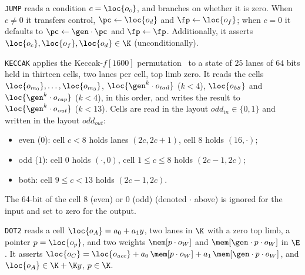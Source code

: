 \texttt{JUMP} reads a condition $c=\loc{o_c}$, and branches on whether it is zero. When $c\neq0$ it transfers control, $\pc\gets\loc{o_d}$ and $\fp\gets\loc{o_f}$; when $c=0$ it defaults to $\pc\gets\gen\cdot\pc$ and $\fp\gets\fp$. Additionally, it asserts $\loc{o_c},\loc{o_f}, \loc{o_d} \in \K$ (unconditionally).

\vspace{5mm}

\texttt{KECCAK} applies the Keccak-$f[1600]$ permutation~\cite{keccak} to a state of $25$ lanes of $64$ bits held in thirteen cells, two lanes per cell, top limb zero. It reads the cells $\loc{o_{m_0}},\dots,\loc{o_{m_3}}$, $\loc{\gen^k\cdot o_{\mathit{tail}}}$ ($k<4$), $\loc{o_{\mathit{b8}}}$ and $\loc{\gen^k\cdot o_{\mathit{cap}}}$ ($k<4$), in this order, and writes the result to $\loc{\gen^k\cdot o_{\mathit{out}}}$ ($k<13$). Cells are read in the layout $\mathit{odd}_{\mathit{in}}\in\{0,1\}$ and written in the layout $\mathit{odd}_{\mathit{out}}$:
\begin{itemize}
\item even ($0$): cell $c<8$ holds lanes $(2c,2c+1)$, cell $8$ holds $(16,\cdot)$;
\item odd ($1$): cell $0$ holds $(\cdot,0)$, cell $1\le c\le8$ holds $(2c-1,2c)$;
\item both: cell $9\le c<13$ holds $(2c-1,2c)$.
\end{itemize}
The 64-bit of the cell 8 (even) or 0 (odd) (denoted $\cdot$ above) is ignored for the input and set to zero for the output.

\vspace{5mm}

\texttt{DOT2} reads a cell $\loc{o_A}=a_0+a_1y$, two lanes in $\K$ with a zero top limb, a pointer $p=\loc{o_p}$, and two weights $\mem[p\cdot o_W]$ and $\mem[\gen\cdot p\cdot o_W]$ in $\E$. It asserts $\loc{o_C}=\loc{o_{\mathit{acc}}}+a_0\,\mem[p\cdot o_W]+a_1\,\mem[\gen\cdot p\cdot o_W]$, and $\loc{o_A}\in\K+\K y$, $p\in\K$.
